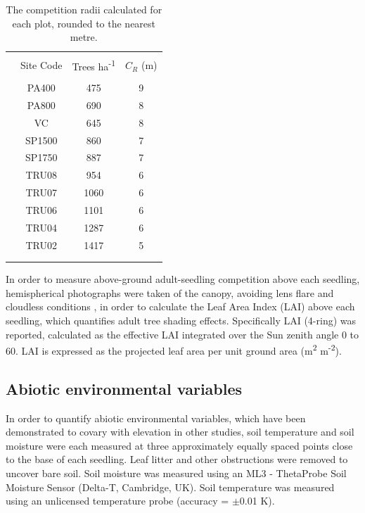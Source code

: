 \documentclass[a4paper,10pt,]{report}
\begin{document}
\begin{table}[H] \centering 
  \caption{The competition radii calculated for each plot, rounded to the nearest metre.} 
  \label{table:CR} 
\begin{tabular}{@{\extracolsep{5pt}} ccSS} 
\\[-1.8ex]\hline 
\hline \\[-1.8ex] 
 & Site Code & {Trees ha\textsuperscript{-1}} & {$C_R$ (m)} \\ 
\hline \\[-1.8ex] 
 & PA400 &  475  &  9  \\ 
 & PA800 &  690  &  8  \\ 
 & VC &  645  &  8  \\ 
 & SP1500 &  860  &  7  \\ 
 & SP1750 &  887  &  7  \\ 
 & TRU08 &  954  &  6  \\ 
 & TRU07 &  1060  &  6  \\ 
 & TRU06 &  1101  &  6  \\ 
 & TRU04 &  1287  &  6  \\ 
 & TRU02 &  1417  &  5  \\ 
\hline \\[-1.8ex] 
\hline \\ 

\end{tabular} 
\end{table} 



In order to measure above-ground adult-seedling competition above each seedling, hemispherical photographs were taken of the canopy, avoiding lens flare and cloudless conditions \citep{Frazer2001}, in order to calculate the Leaf Area Index (LAI) above each seedling, which quantifies adult tree shading effects. Specifically LAI (4-ring) was reported, calculated as the effective LAI integrated over the Sun zenith angle 0 to 60\textdegree \citep{Sternberg1994}. LAI is expressed as the projected leaf area per unit ground area (m\textsuperscript{2} m\textsuperscript{-2}).

\subsection*{Abiotic environmental variables}
In order to quantify abiotic environmental variables, which have been demonstrated to covary with elevation in other studies, soil temperature and soil moisture were each measured at three approximately equally spaced points close to the base of each seedling. Leaf litter and other obstructions were removed to uncover bare soil. Soil moisture was measured using an ML3 - ThetaProbe Soil Moisture Sensor (Delta-T, Cambridge, UK). Soil temperature was measured using an unlicensed temperature probe (accuracy = $\pm$0.01 K).
\end{document}
